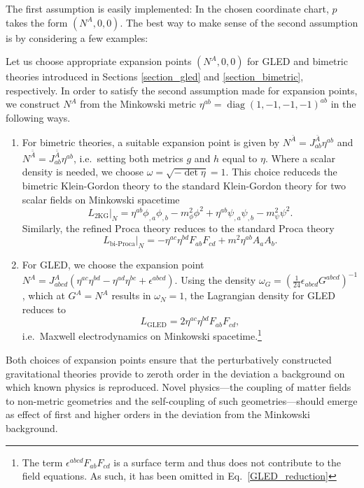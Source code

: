 The first assumption is easily implemented: In the chosen coordinate chart, $p$ takes the form $(N^A,0,0)$. The best way to make sense of the second assumption is by considering a few examples:
\begin{example}
  Let us choose appropriate expansion points $(N^A,0,0)$ for GLED and bimetric theories introduced in Sections \ref{section_gled} and \ref{section_bimetric}, respectively. In order to satisfy the second assumption made for expansion points, we construct $N^A$ from the Minkowski metric $\eta^{ab} = \operatorname{diag}(1,-1,-1,-1)^{ab}$ in the following ways.
  \begin{enumerate}
    \item{For bimetric theories, a suitable expansion point is given by $N^{\bar A} = J_{ab}^{\bar A} \eta^{ab}$ and $N^{\bar{\bar A}} = J_{ab}^{\bar{\bar A}} \eta^{ab}$, i.e.~setting both metrics $g$ and $h$ equal to $\eta$. Where a scalar density is needed, we choose $\omega = \sqrt{-\operatorname{det}\eta} = 1$. This choice reduceds the bimetric Klein-Gordon theory to the standard Klein-Gordon theory for two scalar fields on Minkowski spacetime
      \begin{equation}
        L_\text{2KG}\big\rvert_N = \eta^{ab} \phi_{,a} \phi_{,b} - m_\phi^2\phi^2 + \eta^{ab} \psi_{,a} \psi_{,b} - m_\psi^2\psi^2.
      \end{equation}
    Similarly, the refined Proca theory reduces to the standard Proca theory
      \begin{equation}
        L_\text{bi-Proca}\big\rvert_N = -\eta^{ac}\eta^{bd}F_{ab}F_{cd} + m^2\eta^{ab}A_aA_b.
      \end{equation}}
    \item{For GLED, we choose the expansion point $N^A = J_{abcd}^A (\eta^{ac} \eta^{bd} - \eta^{ad} \eta^{bc} + \epsilon^{abcd})$. Using the density $\omega_G = (\frac{1}{24}\epsilon_{abcd}G^{abcd})^{-1}$, which at $G^A=N^A$ results in $\omega_N = 1$, the Lagrangian density for GLED reduces to
        \begin{equation}\label{GLED_reduction}
        L_\text{GLED} = 2 \eta^{ac}\eta^{bd} F_{ab}F_{cd},
      \end{equation}
    i.e.~Maxwell electrodynamics on Minkowski spacetime.\footnote{The term $\epsilon^{abcd}F_{ab}F_{cd}$ is a surface term and thus does not contribute to the field equations. As such, it has been omitted in Eq.~\ref{GLED_reduction}}}
  \end{enumerate}
\end{example}
Both choices of expansion points ensure that the perturbatively constructed gravitational theories provide to zeroth order in the deviation a background on which known physics is reproduced. Novel physics---the coupling of matter fields to non-metric geometries and the self-coupling of such geometries---should emerge as effect of first and higher orders in the deviation from the Minkowski background.

